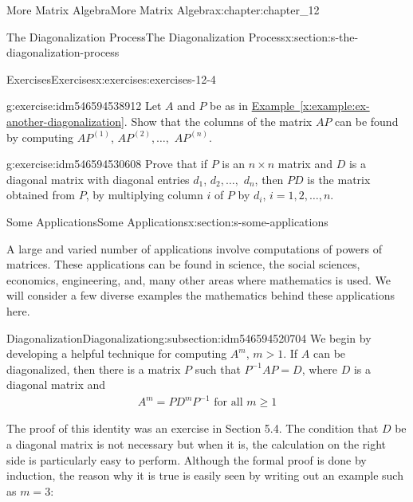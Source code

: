\documentclass[oneside,10pt,]{book}
\newcommand{\xreffont}{\relax}
\numberwithin{equation}{section}
\begin{document}
\begin{chapterptx}{More Matrix Algebra}{}{More Matrix Algebra}{}{}{x:chapter:chapter_12}
\begin{sectionptx}{The Diagonalization Process}{}{The Diagonalization Process}{}{}{x:section:s-the-diagonalization-process}
\begin{exercises-subsection}{Exercises}{}{Exercises}{}{}{x:exercises:exercises-12-4}
\begin{divisionexercise}{7}{}{}{g:exercise:idm546594538912}
Let \(A\) and \(P\) be as in \hyperref[x:example:ex-another-diagonalization]{Example~{\xreffont\ref{x:example:ex-another-diagonalization}}}. Show that the columns of the matrix \(A P\) can be found by computing \(A P^{(1)}\), \(A P^{(2)},\ldots,\) \(A P^{(n)}\).%
\end{divisionexercise}%
\begin{divisionexercise}{8}{}{}{g:exercise:idm546594530608}%
Prove that if \(P\) is an \(n\times n\) matrix and \(D\) is a diagonal matrix with diagonal entries \(d_1\), \(d_2,\ldots,\) \(d_n\), then \(P D\) is the matrix obtained from \(P\), by multiplying column \(i\) of \(P\) by \(d_i\), \(i = 1, 2, \ldots, n\).%
\end{divisionexercise}%
\end{exercises-subsection}
\end{sectionptx}
%
%
\typeout{************************************************}
\typeout{************************************************}
%
\begin{sectionptx}{Some Applications}{}{Some Applications}{}{}{x:section:s-some-applications}
\begin{introduction}{}%
A large and varied number of applications involve computations of powers of matrices. These applications can be found in science, the social sciences, economics, engineering, and, many other areas where mathematics is used.  We will consider a few diverse examples the mathematics behind these applications here.%
\end{introduction}%
%
%
\typeout{************************************************}
\typeout{************************************************}
%
\begin{subsectionptx}{Diagonalization}{}{Diagonalization}{}{}{g:subsection:idm546594520704}
We begin by developing a helpful technique for computing \(A^m\),  \(m > 1\).  If \(A\) can be diagonalized, then there is a matrix \(P\) such that \(P^{-1}A P = D\),  where \(D\) is a diagonal matrix and%
\begin{gather}
A^m= P D^m P^{-1} \textrm{ for all } m\geq 1\label{x:mrow:eq-matrix-power}
\end{gather}
%
\par
The proof of this identity was an exercise in Section 5.4.  The condition that \(D\) be a diagonal matrix is not necessary but when it is, the calculation on the right side is particularly easy to perform.  Although the formal proof  is done by induction, the reason why it is true is easily seen by writing out an example such as \(m=3\):%

\end{subsectionptx}
\end{sectionptx}
\end{chapterptx}
\end{document}
